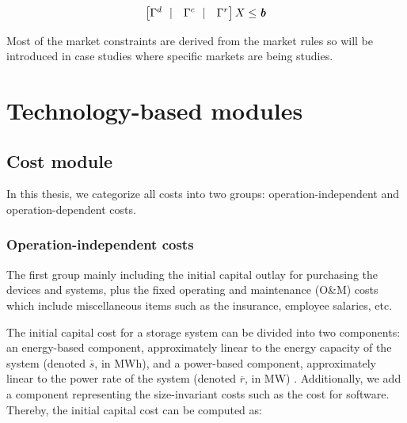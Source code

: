 \begin{equation}
\begin{bmatrix}
\Gamma^d~~|& \Gamma^c~~|&\Gamma^r
\end{bmatrix}
X \leq \textit{\textbf{b}}
\end{equation}

Most of the market constraints are derived from the market rules so will be introduced in case studies where specific markets are being studies. 









\section{Technology-based modules}

\subsection{Cost module}
\label{sec:cost}
In this thesis, we categorize all costs into two groups: operation-independent and operation-dependent costs.

\subsubsection{Operation-independent costs}
The first group mainly including the initial capital outlay for purchasing the devices and systems, plus the fixed operating and maintenance (O\&M) costs which include miscellaneous items such as the insurance, employee salaries, etc. 

The initial capital cost for a storage system can be divided into two components: an energy-based component, approximately linear to the energy capacity of the system (denoted $\overline{s}$, in MWh), and a power-based component, approximately linear to the power rate of the system (denoted $\overline{r}$, in MW) \cite{Megel2017}. Additionally, we add a component representing the size-invariant costs such as the cost for software. Thereby, the initial capital cost can be computed as:

